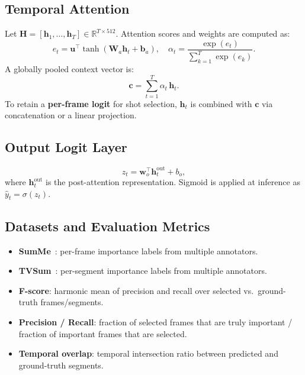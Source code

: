 \documentclass[10pt,conference]{IEEEtran}
\begin{document}
\subsection{Temporal Attention}

Let $\mathbf{H} = [\mathbf{h}_1,\dots,\mathbf{h}_T] \in \mathbb{R}^{T \times 512}$.
Attention scores and weights are computed as:
\begin{equation}
  e_t = \mathbf{u}^\top \tanh(\mathbf{W}_a \mathbf{h}_t + \mathbf{b}_a),
  \quad
  \alpha_t = \frac{\exp(e_t)}{\sum_{k=1}^{T}\exp(e_k)}.
\end{equation}
A globally pooled context vector is:
\begin{equation}
  \mathbf{c} = \sum_{t=1}^{T} \alpha_t\, \mathbf{h}_t.
\end{equation}
To retain a \textbf{per-frame logit} for shot selection, $\mathbf{h}_t$ is
combined with $\mathbf{c}$ via concatenation or a linear projection.

\subsection{Output Logit Layer}

\begin{equation}
  z_t = \mathbf{w}_o^\top \mathbf{h}_t^{\mathrm{out}} + b_o,
\end{equation}
where $\mathbf{h}_t^{\mathrm{out}}$ is the post-attention representation.
Sigmoid is applied at inference as $\hat{y}_t = \sigma(z_t)$.

\subsection{Datasets and Evaluation Metrics}

\begin{itemize}
  \item \textbf{SumMe}~\cite{gygli2014}: per-frame importance labels from
        multiple annotators.
  \item \textbf{TVSum}~\cite{song2015}: per-segment importance labels from
        multiple annotators.
  \item \textbf{F-score}: harmonic mean of precision and recall over selected
        vs.\ ground-truth frames/segments.
  \item \textbf{Precision / Recall}: fraction of selected frames that are
        truly important / fraction of important frames that are selected.
  \item \textbf{Temporal overlap}: temporal intersection ratio between
        predicted and ground-truth segments.
\end{itemize}
\end{document}
